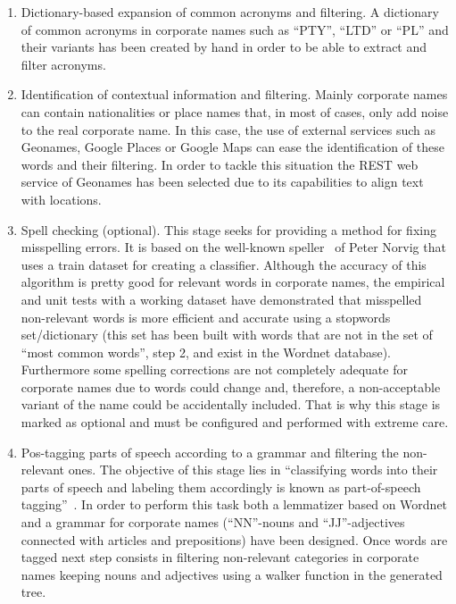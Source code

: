 \documentclass{llncs}
\begin{document}
\begin{enumerate}
\item Dictionary-based expansion of common acronyms and filtering. A dictionary of common acronyms in corporate 
names such as ``PTY'', ``LTD'' or ``PL'' and their variants has been created by hand in order 
to be able to extract and filter acronyms. 


\item Identification of contextual information and filtering. Mainly corporate names can contain nationalities or place names that, in most of 
cases, only add noise to the real corporate name. In this case, the use of external services such as Geonames, Google Places 
or Google Maps can ease the identification of these words and their filtering. In order to tackle this situation the REST web service 
of Geonames has been selected due to its capabilities to align text with locations.

\item Spell checking (optional). This stage seeks for providing a method for fixing misspelling errors. It is based on the 
well-known speller~\cite{NorvigSpelling} of Peter Norvig that uses a train dataset for creating a classifier. Although the accuracy of this 
algorithm is pretty good for relevant words in corporate names, the empirical and unit tests with a working dataset 
have demonstrated that misspelled non-relevant words is more efficient and accurate using a stopwords set/dictionary (this set has been 
built with words that are not in the set of ``most common words'', step 2, and exist in the Wordnet database). Furthermore some spelling corrections 
are not completely adequate for corporate names due to words could change and, therefore, a non-acceptable variant of the name 
could be accidentally included. That is why this stage is marked as optional and must be configured and performed with extreme care.

\item Pos-tagging parts of speech according to a grammar and filtering the non-relevant ones. The objective 
of this stage lies in ``classifying words into their parts of speech and labeling them accordingly is known as part-of-speech tagging''~\cite{LoperBird02}. In order 
to perform this task both a lemmatizer based on Wordnet and a grammar for corporate names (``NN''-nouns and ``JJ''-adjectives connected with articles and 
prepositions) have been designed. Once words are tagged next step consists in filtering non-relevant categories 
in corporate names keeping nouns and adjectives using a walker function in the generated tree.


\end{enumerate}
\end{document}
